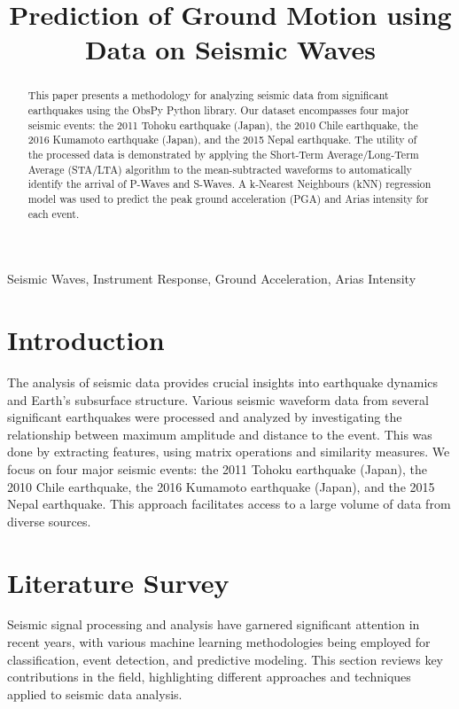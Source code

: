 \documentclass[conference]{IEEEtran}
\date{}
\title{Prediction of Ground Motion using Data on Seismic Waves}
\begin{document}
\maketitle
\begin{abstract}
This paper presents a methodology for analyzing seismic data from significant
earthquakes using the ObsPy Python library. Our dataset encompasses four major
seismic events: the 2011 Tohoku earthquake (Japan), the 2010 Chile earthquake,
the 2016 Kumamoto earthquake (Japan), and the 2015 Nepal earthquake. The utility
of the processed data is demonstrated by applying the Short-Term
Average/Long-Term Average (STA/LTA) algorithm to the mean-subtracted waveforms
to automatically identify the arrival of P-Waves and S-Waves. A k-Nearest
Neighbours (kNN) regression model was used to predict the peak ground
acceleration (PGA) and Arias intensity for each event.


\end{abstract}


\begin{IEEEkeywords}

Seismic Waves, Instrument Response, Ground Acceleration, Arias Intensity

\end{IEEEkeywords}
\section{Introduction}
\label{sec:orgc9e60f9}
The analysis of seismic data provides crucial insights into earthquake dynamics
and Earth's subsurface structure. Various seismic waveform data from several
significant earthquakes were processed and analyzed by investigating the
relationship between maximum amplitude and distance to the event. This was done
by extracting features, using matrix operations and similarity measures. We
focus on four major seismic events: the 2011 Tohoku earthquake (Japan), the 2010
Chile earthquake, the 2016 Kumamoto earthquake (Japan), and the 2015 Nepal
earthquake. This approach facilitates access to a large volume of data from
diverse sources.
\section{Literature Survey}
\label{sec:orgfba83d2}
Seismic signal processing and analysis have garnered significant attention in
recent years, with various machine learning methodologies being employed for
classification, event detection, and predictive modeling. This section reviews
key contributions in the field, highlighting different approaches and techniques
applied to seismic data analysis.
\end{document}
